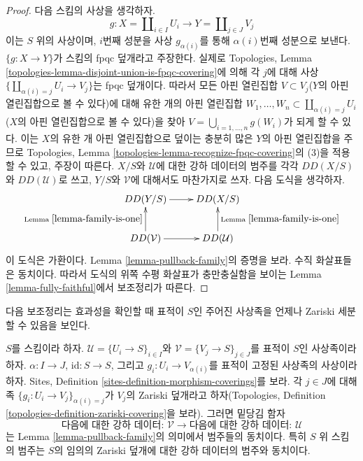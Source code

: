\begin{proof}
다음 스킴의 사상을 생각하자.
$$
g :
X = \coprod\nolimits_{i \in I} U_i
\longrightarrow
Y = \coprod\nolimits_{j \in J} V_j
$$
이는 $S$ 위의 사상이며, $i$번째 성분을 사상 $g_{\alpha(i)}$를 통해
$\alpha(i)$번째 성분으로 보낸다. $\{g : X \to Y\}$가 스킴의 fpqc
덮개라고 주장한다. 실제로 Topologies, Lemma
\ref{topologies-lemma-disjoint-union-is-fpqc-covering}에 의해 각 $j$에
대해 사상 $\{\coprod_{\alpha(i) = j} U_i \to V_j\}$는 fpqc 덮개이다.
따라서 모든 아핀 열린집합 $V \subset V_j$($Y$의 아핀 열린집합으로
볼 수 있다)에 대해 유한 개의 아핀 열린집합
$W_1, \ldots, W_n \subset \coprod_{\alpha(i) = j} U_i$($X$의 아핀
열린집합으로 볼 수 있다)을 찾아
$V = \bigcup_{i = 1, \ldots, n} g(W_i)$가 되게 할 수 있다.
이는 $X$의 유한 개 아핀 열린집합으로 덮이는 충분히 많은 $Y$의 아핀
열린집합을 주므로 Topologies, Lemma
\ref{topologies-lemma-recognize-fpqc-covering}의 (3)을 적용할 수 있고,
주장이 따른다. $X/S$와 $\mathcal{U}$에 대한 강하 데이터의 범주를
각각 $DD(X/S)$와 $DD(\mathcal{U})$로 쓰고, $Y/S$와 $\mathcal{V}$에
대해서도 마찬가지로 쓰자. 다음 도식을 생각하자.
$$
\xymatrix{
DD(Y/S) \ar[r] & DD(X/S) \\
DD(\mathcal{V}) \ar[u]^{\text{Lemma }\ref{lemma-family-is-one}} \ar[r] &
DD(\mathcal{U}) \ar[u]_{\text{Lemma }\ref{lemma-family-is-one}}
}
$$
이 도식은 가환이다. Lemma \ref{lemma-pullback-family}의 증명을 보라.
수직 화살표들은 동치이다. 따라서 도식의 위쪽 수평 화살표가
충만충실함을 보이는 Lemma \ref{lemma-fully-faithful}에서 보조정리가
따른다.
\end{proof}

\noindent
다음 보조정리는 효과성을 확인할 때 표적이 $S$인 주어진 사상족을
언제나 Zariski 세분할 수 있음을 보인다.

\begin{lemma}
\label{lemma-Zariski-refinement-coverings-equivalence}
$S$를 스킴이라 하자. $\mathcal{U} = \{U_i \to S\}_{i \in I}$와
$\mathcal{V} = \{V_j \to S\}_{j \in J}$를 표적이 $S$인 사상족이라
하자. $\alpha : I \to J$, $\text{id} : S \to S$, 그리고
$g_i : U_i \to V_{\alpha(i)}$를 표적이 고정된 사상족의 사상이라 하자.
Sites, Definition \ref{sites-definition-morphism-coverings}를 보라.
각 $j \in J$에 대해 족 $\{g_i : U_i \to V_j\}_{\alpha(i) = j}$가
$V_j$의 Zariski 덮개라고 하자(Topologies, Definition
\ref{topologies-definition-zariski-covering}을 보라). 그러면 밑당김 함자
$$
\text{다음에 대한 강하 데이터: }
\mathcal{V}
\longrightarrow
\text{다음에 대한 강하 데이터: }
\mathcal{U}
$$
는 Lemma \ref{lemma-pullback-family}의 의미에서 범주들의 동치이다.
특히 $S$ 위 스킴의 범주는 $S$의 임의의 Zariski 덮개에 대한 강하
데이터의 범주와 동치이다.
\end{lemma}

